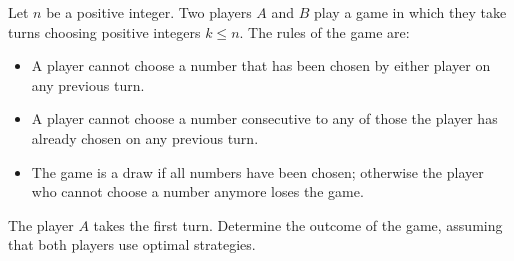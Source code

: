 Let 
$n$
 be a positive integer. Two players 
$A$
 and 
$B$
 play a game in which they take turns choosing positive integers 
$k \le n$.
 The rules of the game are:

\begin{itemize}
    \item A player cannot choose a number that has been chosen by either player on any previous turn.
    \item A player cannot choose a number consecutive to any of those the player has already chosen on any previous turn.
    \item The game is a draw if all numbers have been chosen; otherwise the player who cannot choose a number anymore loses the game.
\end{itemize}

The player 
$A$
takes the first turn. Determine the outcome of the game, assuming that both players use optimal strategies.